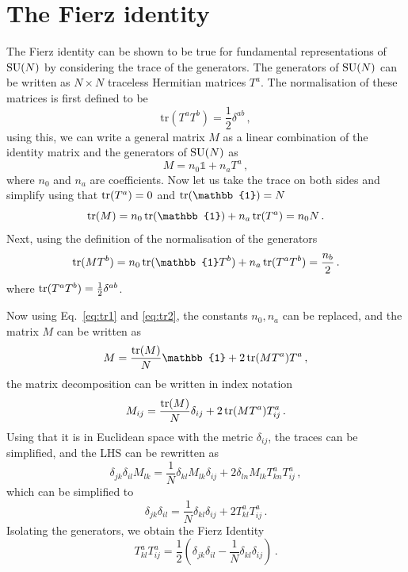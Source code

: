 \section{The Fierz identity}\label{app:Fierz}
The Fierz identity can be shown to be true for fundamental representations of $\mathrm{SU}(N)$ by considering the trace of the generators. The generators of $\mathrm{SU}(N)$ can be written as $N\times N $ traceless Hermitian matrices $T^a$. The normalisation of these matrices is first defined to be 
\begin{equation}
      \text{tr}(T^a T^b)=\frac{1}{2}\delta^{ab}\,,
\end{equation}
using this, we can write a general matrix $M$ as a linear combination of the identity matrix and the generators of $\mathrm{SU}(N)$ as
\begin{equation}
      M=n_0 \mathbb{1}+n_aT^a\,,
\end{equation}
where $n_0$ and $n_a$ are coefficients. Now let us take the trace on both sides and simplify using that $\operatorname{tr}(T^a)=0$ and $\tr(\mathbb{1})=N$
\begin{equation}
      \tr(M)=n_0 \tr(\mathbb{1})+n_a\tr(T^a)=n_0N\,.\label{eq:tr1}
\end{equation}
Next, using the definition of the normalisation of the generators
\begin{equation}
      \tr(MT^b)=n_0 \tr(\mathbb{1}T^b)+n_a\tr(T^aT^b)=\frac{n_b}{2}\,.\label{eq:tr2}
\end{equation}
where $\operatorname{tr}(T^aT^b)=\frac{1}{2}\delta^{ab}$.

Now using Eq.~\eqref{eq:tr1} and \eqref{eq:tr2}, the constants $n_0,n_a$ can be replaced, and the matrix $M$ can be written as
\begin{equation}
      M=\frac{\tr(M)}{N} \mathbb{1}+2\tr(MT^a)T^a\,,
\end{equation}
the matrix decomposition can be written in index notation
\begin{equation}
      M_{ij}=\frac{\operatorname{tr}(M)}{N} \delta_{ij}+2\operatorname{tr}(MT^a)T^a_{ij}\,.
\end{equation}
Using that it is in Euclidean space with the metric $\delta_{ij}$, the traces can be simplified, and the LHS can be rewritten as
\begin{equation}
      \delta_{jk}\delta_{il}M_{lk}=\frac{1}{N} \delta_{kl}M_{lk}\delta_{ij}+2\delta_{ln}M_{lk}T^a_{kn}T^a_{ij}\,,
\end{equation}
which can be simplified to 
\begin{equation}
      \delta_{jk}\delta_{il}=\frac{1}{N} \delta_{kl}\delta_{ij}+2T^a_{kl}T^a_{ij}\,.
\end{equation}
Isolating the generators, we obtain the Fierz Identity 
\begin{equation}
      T^a_{kl}T^a_{ij}=\frac{1}{2}\left(\delta_{jk}\delta_{il}-\frac{1}{N} \delta_{kl}\delta_{ij}\right)\,.
\end{equation}

